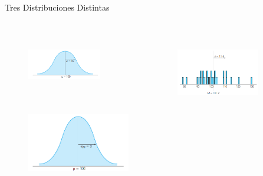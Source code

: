 \documentclass{beamer}
\begin{document}
\begin{frame}{Tres Distribuciones Distintas}
	\begin{columns}
		\begin{column}{.49\textwidth}
			\centering
			\only<1>{}\\[1ex]
	\begin{figure}[H]
		\centering  
		\caption{} 
		\includegraphics[width = 0.8\textwidth]{./cap2}
	\end{figure}
		\end{column}
		
		\begin{column}{.49\textwidth}
			\centering
			\only<1>{}\\[1ex]
	\begin{figure}[H]
		\centering  
		\caption{} 
		\includegraphics[width = 0.8\textwidth]{./cap3}
	\end{figure}
			
		\end{column}
					\end{columns}
					\begin{figure}[H]
						\centering  
						\caption{} 
						\includegraphics[width = 0.4\textwidth]{./cap4}
					\end{figure}

\end{frame}
\end{document}
